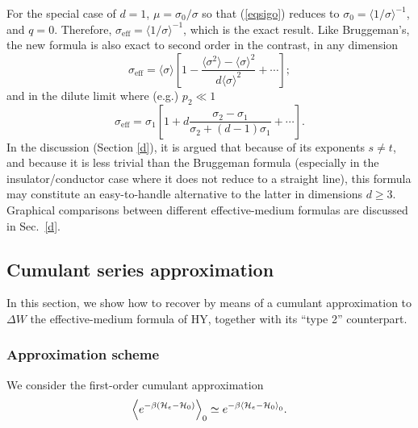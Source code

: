 For the special case of $d=1$, $\mu=\sigma_0/\sigma$ so that
(\ref{eqsigo}) reduces to $\sigma_0=\langle1/\sigma\rangle^{-1}$,
and $q=0$. Therefore, $\sigma_{\text{eff}}=\langle1/\sigma\rangle^{-1}$,
which is the exact result. Like Bruggeman's, the new formula
is also exact to second order in the
contrast, in any dimension
\begin{equation}
\label{wcl}
\sigma_{\text{eff}}=\langle\sigma\rangle\left[1-\frac{\langle \sigma^2\rangle-\langle\sigma\rangle^2}{d\langle\sigma\rangle^2} +\cdots\right];
\end{equation}
and in the dilute limit where (e.g.) $p_2\ll 1$
\begin{equation}
\label{dl}
\sigma_{\text{eff}}=\sigma_1\left[1+d\frac{\sigma_2-\sigma_1} {\sigma_2+(d-1)\sigma_1}+\cdots\right].
\end{equation}
In the discussion (Section \ref{d}), it is argued that because
of its exponents $s\not= t$, and because it is less trivial than
the Bruggeman formula (especially in the insulator/conductor case
where it does not reduce to a straight line), this formula may
constitute an easy-to-handle alternative to the latter in dimensions
$d\geq 3$. Graphical comparisons between different effective-medium
formulas are discussed in Sec.\ \ref{d}.

\subsection{Cumulant series approximation}
\label{asa}

In this section, we show how to recover by means of a cumulant
approximation to $\Delta W$ the effective-medium formula of HY,
together with its ``type 2'' counterpart.

\subsubsection{Approximation scheme}
We consider the first-order cumulant approximation
\begin{equation}
\label{cumul}
\left\langle
e^{-\beta({\cal{H}}_e-{\cal{H}}_0)}
\right\rangle_0\simeq
e^{-\beta\left\langle{\cal{H}}_e-{\cal{H}}_0\right\rangle_0}.
\end{equation}

